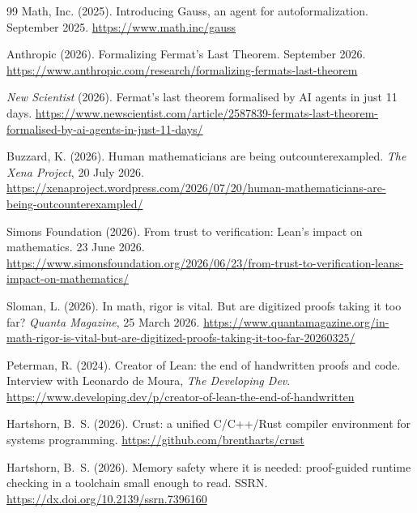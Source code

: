 \documentclass[11pt]{article}
\begin{document}
\begin{thebibliography}{99}
 Math, Inc. (2025). Introducing Gauss, an agent for
autoformalization. September 2025. \url{https://www.math.inc/gauss}

 Anthropic (2026). Formalizing Fermat's Last Theorem.
September 2026. \url{https://www.anthropic.com/research/formalizing-fermats-last-theorem}

 \emph{New Scientist} (2026). Fermat's last
theorem formalised by AI agents in just 11 days.
\url{https://www.newscientist.com/article/2587839-fermats-last-theorem-formalised-by-ai-agents-in-just-11-days/}

 Buzzard, K. (2026). Human mathematicians are being
outcounterexampled. \emph{The Xena Project}, 20 July 2026.
\url{https://xenaproject.wordpress.com/2026/07/20/human-mathematicians-are-being-outcounterexampled/}

 Simons Foundation (2026). From trust to verification:
Lean's impact on mathematics. 23 June 2026.
\url{https://www.simonsfoundation.org/2026/06/23/from-trust-to-verification-leans-impact-on-mathematics/}

 Sloman, L. (2026). In math, rigor is vital. But are
digitized proofs taking it too far? \emph{Quanta Magazine}, 25 March 2026.
\url{https://www.quantamagazine.org/in-math-rigor-is-vital-but-are-digitized-proofs-taking-it-too-far-20260325/}

 Peterman, R. (2024). Creator of Lean: the end of
handwritten proofs and code. Interview with Leonardo de Moura, \emph{The
Developing Dev}.
\url{https://www.developing.dev/p/creator-of-lean-the-end-of-handwritten}

 Hartshorn, B.~S. (2026). Crust: a unified C/C++/Rust compiler
environment for systems programming. \url{https://github.com/brentharts/crust}

 Hartshorn, B.~S. (2026). Memory safety where it is needed:
proof-guided runtime checking in a toolchain small enough to read. SSRN.
\url{https://dx.doi.org/10.2139/ssrn.7396160}

\end{thebibliography}
\end{document}
